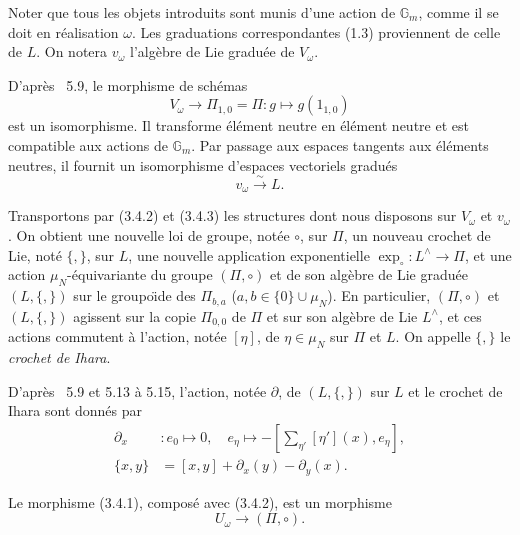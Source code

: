 \documentclass[11pt,a4paper]{article}
\theoremstyle{plain}
\theoremstyle{definition}
\newcommand{\Gm}{\mathbb{G}_m}
\begin{document}
Noter que tous les objets introduits sont munis d'une action de $\Gm$, comme il se doit en r\'ealisation $\omega$. Les graduations correspondantes (1.3) proviennent de celle de $L$. On notera $v_\omega$ l'alg\`ebre de Lie gradu\'ee de $V_\omega$.

D'apr\`es \cite{1}~5.9, le morphisme de sch\'emas
\begin{equation}\label{eq:3.4.2}
V_\omega \to \Pi_{1,0} = \Pi: g \mapsto g(1_{1,0})
\end{equation}
est un isomorphisme. Il transforme \'el\'ement neutre en \'el\'ement neutre et est compatible aux actions de $\Gm$. Par passage aux espaces tangents aux \'el\'ements neutres, il fournit un isomorphisme d'espaces vectoriels gradu\'es
\begin{equation}\label{eq:3.4.3}
v_\omega \xrightarrow{\sim} L.
\end{equation}

Transportons par (3.4.2) et (3.4.3) les structures dont nous disposons sur $V_\omega$ et $v_\omega$. On obtient une nouvelle loi de groupe, not\'ee $\circ$, sur $\Pi$, un nouveau crochet de Lie, not\'e $\{,\}$, sur $L$, une nouvelle application exponentielle $\exp_\circ: L^{\wedge} \to \Pi$, et une action $\mu_N$-\'equivariante du groupe $(\Pi, \circ)$ et de son alg\`ebre de Lie gradu\'ee $(L, \{,\})$ sur le groupo\"{\i}de des $\Pi_{b,a}$ ($a,b \in \{0\} \cup \mu_N$). En particulier, $(\Pi, \circ)$ et $(L, \{,\})$ agissent sur la copie $\Pi_{0,0}$ de $\Pi$ et sur son alg\`ebre de Lie $L^{\wedge}$, et ces actions commutent \`a l'action, not\'ee $[\eta]$, de $\eta \in \mu_N$ sur $\Pi$ et $L$. On appelle $\{,\}$ le {\em crochet de Ihara}.

D'apr\`es \cite{1}~5.9 et 5.13 \`a 5.15, l'action, not\'ee $\partial$, de $(L, \{,\})$ sur $L$ et le crochet de Ihara sont donn\'es par
\begin{align}
\partial_x &: e_0 \mapsto 0, \quad e_\eta \mapsto -[\sum_{\eta'} [\eta'](x), e_\eta], \label{eq:3.4.4}\\
\{x,y\} &= [x,y] + \partial_x(y) - \partial_y(x). \label{eq:3.4.5}
\end{align}

Le morphisme (3.4.1), compos\'e avec (3.4.2), est un morphisme
\begin{equation}\label{eq:3.4.6}
U_\omega \to (\Pi, \circ).
\end{equation}
\end{document}
